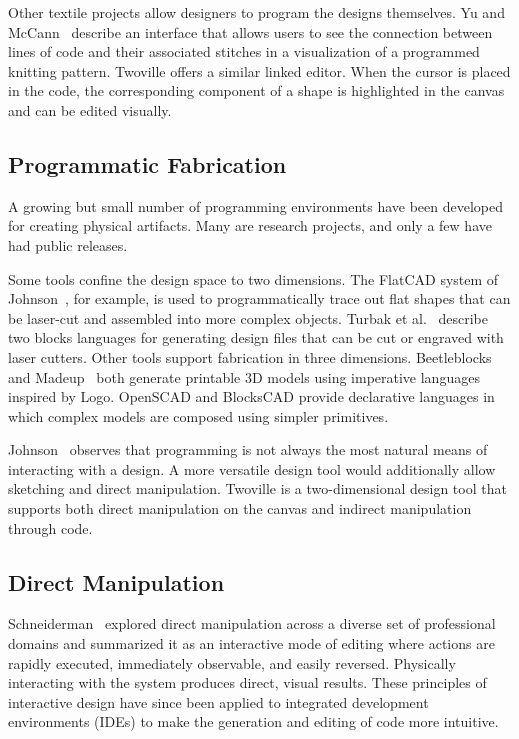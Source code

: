 Other textile projects allow designers to program the designs themselves. Yu and McCann~\cite{yu2020coupling} describe an interface that allows users to see the connection between lines of code and their associated stitches in a visualization of a programmed knitting pattern. Twoville offers a similar linked editor. When the cursor is placed in the code, the corresponding component of a shape is highlighted in the canvas and can be edited visually.

\subsection{Programmatic Fabrication}
A growing but small number of programming environments have been developed for creating physical artifacts. Many are research projects, and only a few have had public releases.

Some tools confine the design space to two dimensions. The FlatCAD system of Johnson~\cite{johnson08flat}, for example, is used to programmatically trace out flat shapes that can be laser-cut and assembled into more complex objects. Turbak et al.~\cite{turbak12tangible} describe two blocks languages for generating design files that can be cut or engraved with laser cutters. Other tools support fabrication in three dimensions. Beetleblocks~\cite{koschitz12exploring} and Madeup~\cite{johnson17toward} both generate printable 3D models using imperative languages inspired by Logo. OpenSCAD and BlocksCAD provide declarative languages in which complex models are composed using simpler primitives.

Johnson~\cite{johnson08flat} observes that programming is not always the most natural means of interacting with a design. A more versatile design tool would additionally allow sketching and direct manipulation. Twoville is a two-dimensional design tool that supports both direct manipulation on the canvas and indirect manipulation through code.

\subsection{Direct Manipulation}
Schneiderman~\cite{shneiderman19931} explored direct manipulation across a diverse set of professional domains and summarized it as an interactive mode of editing where actions are rapidly executed, immediately observable, and easily reversed. Physically interacting with the system produces direct, visual results. These principles of interactive design have since been applied to integrated development environments (IDEs) to make the generation and editing of code more intuitive.

